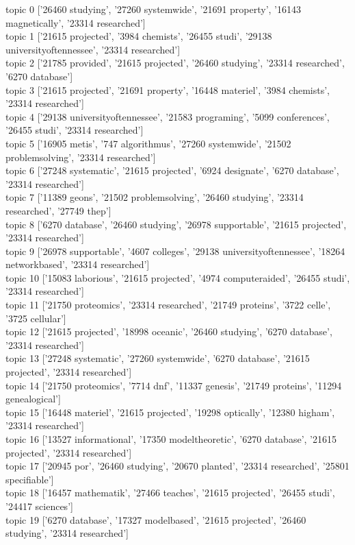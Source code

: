 \documentclass[submit]{harvardml}
\begin{document}
\noindent
topic 0 ['26460 studying', '27260 systemwide', '21691 property', '16143 magnetically', '23314 researched'] \\
topic 1 ['21615 projected', '3984 chemists', '26455 studi', '29138 universityoftennessee', '23314 researched'] \\
topic 2 ['21785 provided', '21615 projected', '26460 studying', '23314 researched', '6270 database'] \\
topic 3 ['21615 projected', '21691 property', '16448 materiel', '3984 chemists', '23314 researched'] \\
topic 4 ['29138 universityoftennessee', '21583 programing', '5099 conferences', '26455 studi', '23314 researched'] \\
topic 5 ['16905 metis', '747 algorithmus', '27260 systemwide', '21502 problemsolving', '23314 researched'] \\
topic 6 ['27248 systematic', '21615 projected', '6924 designate', '6270 database', '23314 researched'] \\
topic 7 ['11389 geons', '21502 problemsolving', '26460 studying', '23314 researched', '27749 thep'] \\
topic 8 ['6270 database', '26460 studying', '26978 supportable', '21615 projected', '23314 researched'] \\
topic 9 ['26978 supportable', '4607 colleges', '29138 universityoftennessee', '18264 networkbased', '23314 researched'] \\
topic 10 ['15083 laborious', '21615 projected', '4974 computeraided', '26455 studi', '23314 researched'] \\
topic 11 ['21750 proteomics', '23314 researched', '21749 proteins', '3722 celle', '3725 cellular'] \\
topic 12 ['21615 projected', '18998 oceanic', '26460 studying', '6270 database', '23314 researched'] \\
topic 13 ['27248 systematic', '27260 systemwide', '6270 database', '21615 projected', '23314 researched'] \\
topic 14 ['21750 proteomics', '7714 dnf', '11337 genesis', '21749 proteins', '11294 genealogical'] \\
topic 15 ['16448 materiel', '21615 projected', '19298 optically', '12380 higham', '23314 researched'] \\
topic 16 ['13527 informational', '17350 modeltheoretic', '6270 database', '21615 projected', '23314 researched'] \\
topic 17 ['20945 por', '26460 studying', '20670 planted', '23314 researched', '25801 specifiable'] \\
topic 18 ['16457 mathematik', '27466 teaches', '21615 projected', '26455 studi', '24417 sciences'] \\
topic 19 ['6270 database', '17327 modelbased', '21615 projected', '26460 studying', '23314 researched'] \\
\end{document}
